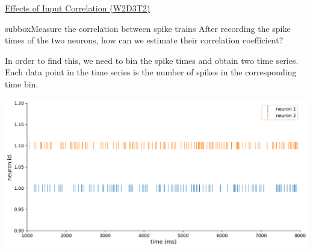 \begin{textbox}{\href{https://compneuro.neuromatch.io/tutorials/W1D4_GeneralizedLinearModels/student/W1D4_Tutorial1.html}{Effects of Input Correlation (W2D3T2)} }
\begin{subbox}{subbox}{Measure the correlation between spike trains}
After recording the spike times of the two neurons, how can we estimate their correlation coefficient? 

In order to find this, we need to bin the spike times and obtain two time series. Each data point in the time series is the number of spikes in the corresponding time bin.

\begin{center}
    
\includegraphics[scale=0.17]{Figures/BNM/LIF_Figure6.png}
\end{center}

\end{subbox}
\end{textbox}

